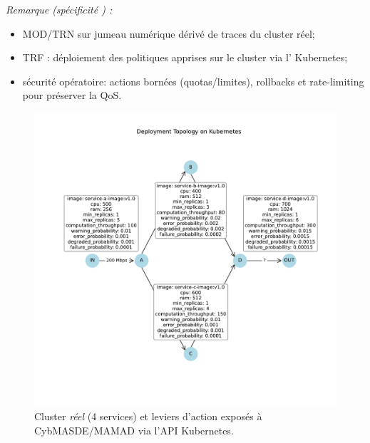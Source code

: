 \medskip
\noindent\textit{Remarque (spécificité ) :}
\begin{itemize}
  \item \textsc{MOD/TRN} sur jumeau numérique dérivé de traces du cluster réel;
  \item \textsc{TRF} : déploiement des politiques apprises sur le cluster via l' Kubernetes;
  \item sécurité opératoire: actions bornées (quotas/limites), rollbacks et rate-limiting pour préserver la QoS.
\end{itemize}

\begin{figure}[h!]
  \centering
  \includegraphics[trim=1.8cm 3.3cm 1.25cm 3.5cm, clip, width=\linewidth]{figures/k8s_cluster_graph.pdf}
  \caption{Cluster \emph{réel}  (4 services) et leviers d'action exposés à CybMASDE/MAMAD via l'API Kubernetes.}
  \label{fig:k8s_microservices_real}
\end{figure}

